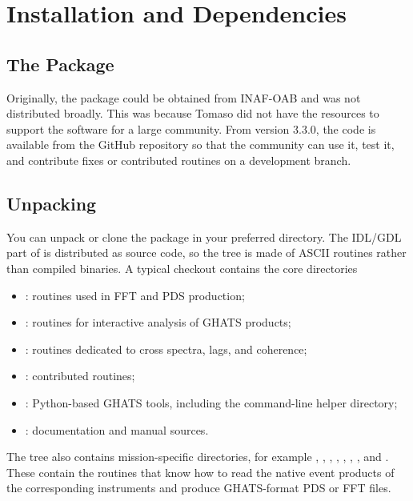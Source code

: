 \chapter{Installation and Dependencies}

\section{The Package}

Originally, the \ghats{} package could be obtained from INAF-OAB and was not
distributed broadly.  This was because Tomaso did not have the resources to
support the software for a large community.  From version 3.3.0, the code is
available from the GitHub repository so that the community can use it, test it,
and contribute fixes or contributed routines on a development branch.

\section{Unpacking}

You can unpack or clone the package in your preferred directory.  The
IDL/GDL part of \ghats{} is distributed as source code, so the tree is made of
ASCII routines rather than compiled binaries.  A typical checkout contains the
core directories

\begin{itemize}
  \item {}: routines used in FFT and PDS production;
  \item {}: routines for interactive analysis of GHATS products;
  \item {}: routines dedicated to cross spectra, lags, and
        coherence;
  \item {}: contributed routines;
  \item {}: Python-based GHATS tools, including the command-line
        helper directory;
  \item {}: documentation and manual sources.
\end{itemize}

The tree also contains mission-specific directories, for example
, , , , ,
, , and .  These contain
the routines that know how to read the native event products of the corresponding
instruments and produce GHATS-format PDS or FFT files.

